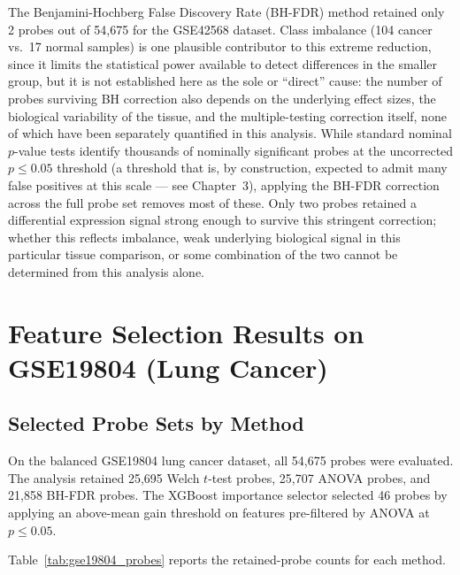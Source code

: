 The Benjamini-Hochberg False Discovery Rate (BH-FDR) method retained only 2 probes out of 54,675 for the GSE42568 dataset. Class imbalance (104 cancer vs.\ 17 normal samples) is one plausible contributor to this extreme reduction, since it limits the statistical power available to detect differences in the smaller group, but it is not established here as the sole or ``direct'' cause: the number of probes surviving BH correction also depends on the underlying effect sizes, the biological variability of the tissue, and the multiple-testing correction itself, none of which have been separately quantified in this analysis. While standard nominal $p$-value tests identify thousands of nominally significant probes at the uncorrected $p \leq 0.05$ threshold (a threshold that is, by construction, expected to admit many false positives at this scale --- see Chapter~3), applying the BH-FDR correction across the full probe set removes most of these. Only two probes retained a differential expression signal strong enough to survive this stringent correction; whether this reflects imbalance, weak underlying biological signal in this particular tissue comparison, or some combination of the two cannot be determined from this analysis alone.

\section{Feature Selection Results on GSE19804 (Lung Cancer)}

\subsection{Selected Probe Sets by Method}

On the balanced GSE19804 lung cancer dataset, all 54,675 probes were evaluated. The analysis retained 25,695 Welch $t$-test probes, 25,707 ANOVA probes, and 21,858 BH-FDR probes. The XGBoost importance selector selected 46 probes by applying an above-mean gain threshold on features pre-filtered by ANOVA at $p \leq 0.05$.

Table~\ref{tab:gse19804_probes} reports the retained-probe counts for each method.

